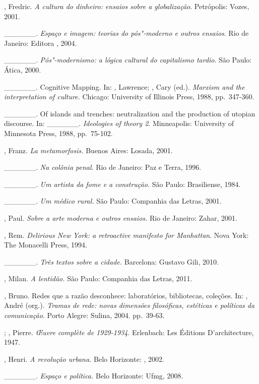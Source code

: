 \begin{Parskip}
, Fredric. \emph{A cultura do dinheiro: ensaios sobre a
globalização}. Petrópolis: Vozes, 2001.

\_\_\_\_\_\_. \emph{Espaço e imagem: teorias do pós"-moderno e
outros ensaios}. Rio de Janeiro: Editora , 2004.

\_\_\_\_\_\_. \emph{Pós"-modernismo: a lógica cultural do
capitalismo tardio}. São Paulo: Ática, 2000.

\_\_\_\_\_\_. Cognitive Mapping. In: , Lawrence; ,
Cary (ed.). \emph{Marxism and the interpretation of culture.} Chicago:
University of Illinois Press, 1988, pp.~347-360.

\_\_\_\_\_\_. Of islands and trenches: neutralization and the
production of utopian discourse. In: \_\_\_\_\_\_.
\emph{Ideologies of theory 2}. Minneapolis: University of Minnesota
Press, 1988, pp.~75-102.

, Franz. \emph{La metamorfosis.} Buenos Aires: Losada, 2001.

\_\_\_\_\_\_. \emph{Na colônia penal}. Rio de Janeiro: Paz e Terra, 1996.

\_\_\_\_\_\_. \emph{Um artista da fome e a construção.} São Paulo:
Brasiliense, 1984.

\_\_\_\_\_\_. \emph{Um médico rural.} São Paulo: Companhia das
Letras, 2001.

, Paul. \emph{Sobre a arte moderna e outros ensaios.} Rio de
Janeiro: Zahar, 2001.

, Rem. \emph{Delirious New York: a retroactive manifesto for
Manhattan}. Nova York: The Monacelli Press, 1994.

\_\_\_\_\_\_. \emph{Três textos sobre a cidade.} Barcelona:
Gustavo Gili, 2010.

, Milan. \emph{A lentidão.} São Paulo: Companhia das Letras,
2011.

, Bruno. Redes que a razão desconhece: laboratórios,
bibliotecas, coleções. In: , André (org.). \emph{Tramas de
rede: novas dimensões filosóficas, estéticas e políticas da
comunicação}. Porto Alegre: Sulina, 2004. pp.~39-63.

; , Pierre. \emph{\OE uvre complète de 1929-1934}.
Erlenbach: Les Éditions D'architecture, 1947.

, Henri. \emph{A revolução urbana.} Belo Horizonte: ,
2002.

\_\_\_\_\_\_. \emph{Espaço e política.} Belo Horizonte: Ufmg, 2008.


\end{Parskip}
